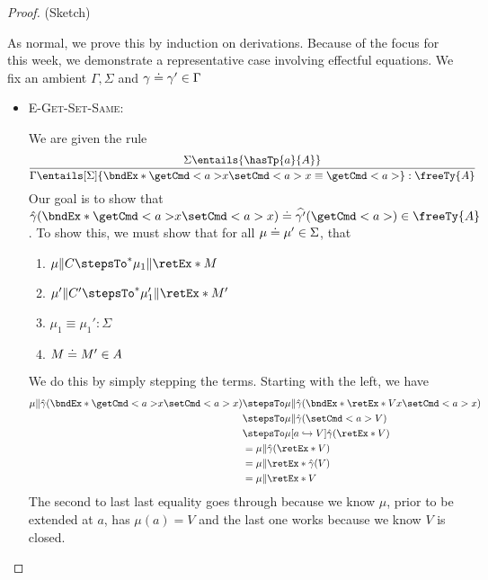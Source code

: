 \documentclass[letterpaper]{article}
\begin{document}
\begin{proof} (Sketch)

    As normal, we prove this by induction on derivations. Because of the focus for this week, we demonstrate a representative case involving effectful equations. We fix an ambient $\Gamma, \Sigma$ and $\gamma\mathrel{\doteq}\gamma' \in \Gamma$
\begin{itemize}
    \item[] \textsc{E-Get-Set-Same}:
    
        We are given the rule
        \[
        \infer[]
    { \Gamma \entails[\Sigma]{\bndEx*{\getCmd<a>}{x}{\setCmd<a>{x}} \equiv \getCmd<a>} : \freeTy{A} } { \Sigma \entails{\hasTp{a}{A}} }
        \]
        Our goal is to show that $\exEqOf{\hat{\gamma}(\bndEx*{\getCmd<a>}{x}{\setCmd<a>{x}})}{\widehat{\gamma'}(\getCmd<a>)}{\freeTy{A}}$. To show this, we must show that for all $\mu\mathrel{\doteq}\mu' \in \Sigma$, that
        \begin{enumerate}
            \item $\mu \Vert C \stepsTo^* \mu_1 \Vert \retEx*{M}$\\
            \item $\mu' \Vert C' \stepsTo^* \mu_1' \Vert \retEx*{M'}$\\
            \item $\mu_1 \equiv \mu_1' : \Sigma$\\
            \item $M\mathrel{\doteq}M' \in A$\\
        \end{enumerate}
        We do this by simply stepping the terms. Starting with the left, we have 
        \begin{align*}
            \mu \Vert \hat{\gamma}(\bndEx*{\getCmd<a>}{x}{\setCmd<a>{x}}) 
            &\stepsTo \mu \Vert \hat{\gamma}(\bndEx*{\retEx*{V}}{x}{\setCmd<a>{x}})\\
            &\stepsTo  \mu \Vert \hat{\gamma}(\setCmd<a>{V})\\
            &\stepsTo \mu[a \hookrightarrow V]\hat{\gamma}(\retEx*{V})\\
            &= \mu \Vert \hat{\gamma}(\retEx*{V})\\
            &=\mu \Vert\retEx*{\hat{\gamma}(V)}\\
            &= \mu \Vert\retEx*{V}\\
        \end{align*}
        The second to last last equality goes through because we know $\mu$, prior to be extended at $a$, has $\mu(a) = V$ and the last one works because we know $V$ is closed.

\end{itemize}
\end{proof}
\end{document}
